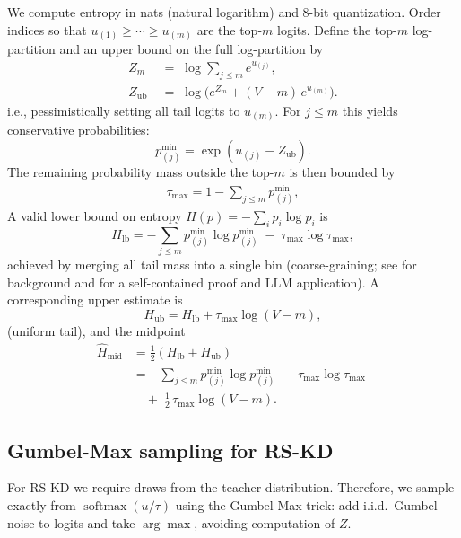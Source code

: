 \documentclass[11pt]{article}
\begin{document}
We compute entropy in nats (natural logarithm) and 8-bit quantization.
Order indices so that $u_{(1)} \geq \cdots \geq u_{(m)}$ are the top-$m$ logits.
Define the top-$m$ log-partition and an upper bound on the full log-partition by
\begin{align*}
	Z_m \;           & =\; \log \sum_{j \leq m} e^{u_{(j)}},            \\
	Z_{\text{ub}} \; & =\; \log\Big(e^{Z_m} + (V-m)\,e^{u_{(m)}}\Big).
\end{align*}
i.e., pessimistically setting all tail logits to $u_{(m)}$. For $j\le m$ this yields conservative probabilities:
\[
	p^{\min}_{(j)}=\exp(u_{(j)}-Z_{\text{ub}}).
\]
The remaining probability mass outside the top-$m$ is then bounded by
\begin{align*}
	\tau_{\max}=1-\sum_{j\le m}p^{\min}_{(j)},
\end{align*}
A valid lower bound on entropy $H(p)=-\sum_i p_i\log p_i$ is
\[
	H_{\text{lb}}=-\sum_{j\le m} p^{\min}_{(j)}\log p^{\min}_{(j)}\;-\;\tau_{\max}\log\tau_{\max},
\]
achieved by merging all tail mass into a single bin (coarse-graining; see \citep{cover2006elements} for background and \citep[\S3.6]{kaltchenko2025entropyheatmap} for a self-contained proof and LLM application). A corresponding upper estimate is
\[
	H_{\text{ub}}=H_{\text{lb}}+\tau_{\max}\log(V-m),
\]
(uniform tail), and the midpoint
\begin{align*}
	\widehat{H}_{\text{mid}} & =\tfrac12\!\left(H_{\text{lb}}+H_{\text{ub}}\right)                                   \\
	                         & = -\sum_{j\le m}p^{\min}_{(j)}\log p^{\min}_{(j)} \;-\; \tau_{\max}\log\tau_{\max} \; \\
	                         & \quad +\; \tfrac12\,\tau_{\max}\log(V-m).
\end{align*}

\subsection{Gumbel-Max sampling for RS-KD}
For RS-KD we require draws from the teacher distribution.
Therefore, we sample exactly from $\operatorname{softmax}(u/\tau)$ using the Gumbel-Max trick: add i.i.d.\ Gumbel noise to logits and take $\arg\max$, avoiding computation of $Z$.
\end{document}
